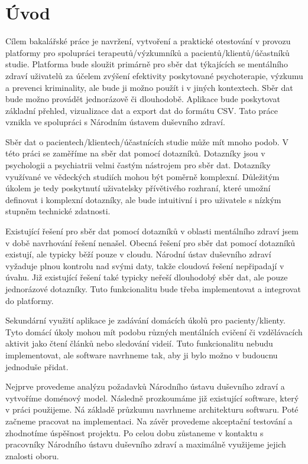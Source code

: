 \chapter*{Úvod}

Cílem bakalářské práce je navržení, vytvoření a praktické otestování v provozu
platformy pro spolupráci terapeutů/výzkumníků a pacientů/klientů/účastníků
studie. Platforma bude sloužit primárně pro sběr dat týkajících se mentálního
zdraví uživatelů za účelem zvýšení efektivity poskytované psychoterapie,
výzkumu a prevenci kriminality, ale bude ji možno použít i v jiných kontextech.
Sběr dat bude možno provádět jednorázově či dlouhodobě. Aplikace bude
poskytovat základní přehled, vizualizace dat a export dat do formátu CSV. Tato
práce vznikla ve spolupráci s Národním ústavem duševního zdraví.

Sběr dat o pacientech/klientech/účastnících studie může mít mnoho podob. V této
práci se zaměříme na sběr dat pomocí dotazníků. Dotazníky jsou v psychologii a
psychiatrii velmi častým nástrojem pro sběr dat. Dotazníky využívané ve
vědeckých studiích mohou být poměrně komplexní. Důležitým úkolem je tedy
poskytnutí uživatelsky přívětivého rozhraní, které umožní definovat i komplexní
dotazníky, ale bude intuitivní i pro uživatele s nízkým stupněm technické
zdatnosti.

Existující řešení pro sběr dat pomocí dotazníků v oblasti mentálního zdraví
jsem v době navrhování řešení nenašel. Obecná řešení pro sběr dat pomocí
dotazníků existují, ale typicky běží pouze v cloudu. Národní ústav duševního
zdraví vyžaduje plnou kontrolu nad svými daty, takže cloudová řešení
nepřipadají v úvahu. Již existující řešení také typicky neřeší dlouhodobý sběr
dat, ale pouze jednorázové dotazníky. Tuto funkcionalitu bude třeba
implementovat a integrovat do platformy.

Sekundární využití aplikace je zadávání domácích úkolů pro pacienty/klienty.
Tyto domácí úkoly mohou mít podobu různých mentálních cvičení či vzdělávacích
aktivit jako čtení článků nebo sledování videií. Tuto funkcionalitu nebudu
implementovat, ale software navrhneme tak, aby ji bylo možno v budoucnu jednoduše
přidat.

Nejprve provedeme analýzu požadavků Národního ústavu duševního zdraví a
vytvoříme doménový model. Následně prozkoumáme již existující software, který v
práci použijeme. Ná základě průzkumu navrhneme architekturu softwaru. Poté
začneme pracovat na implementaci. Na závěr provedeme akceptační testování a
zhodnotíme úspěšnost projektu. Po celou dobu zůstaneme v kontaktu s pracovníky
Národního ústavu duševního zdraví a maximálně využijeme jejich znalosti oboru.